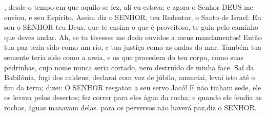 {{}, desde o tempo em que aquilo se fez, ali eu estava; e agora o Senhor DEUS me enviou, e seu Espírito.
  Assim diz o SENHOR, teu Redentor, o Santo de Israel: Eu sou o SENHOR teu Deus, que te ensina o que é proveitoso,
{} te guia pelo caminho que deves andar.
  Ah, se tu tivesses me dado ouvidos a meus mandamentos! Então tua paz teria sido como um rio, e tua justiça como as ondas do mar.
  Também tua semente teria sido como a areia, e os que procedem do teu corpo, como suas pedrinhas, cujo nome nunca seria cortado, nem destruído de minha face.
  Saí da Babilônia, fugi dos caldeus; declarai com voz de júbilo, anunciai,
{} levai isto até o fim da terra; dizei: O SENHOR resgatou a seu servo Jacó!
  E não tinham sede,
{} ele os levava pelos desertos; fez correr para eles água da rocha; e quando ele fendia as rochas, águas manavam delas.
   para os perversos não haverá paz,diz o SENHOR.
\par }

